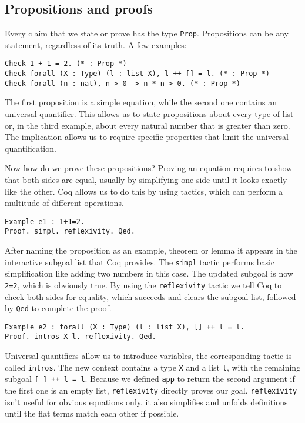\documentclass{scrreprt}
\newcommand{\todo}[1]{\marginpar{\textbf{TODO:} #1}}
\begin{document}
\subsection{Propositions and proofs}
Every claim that we state or prove has the type \texttt{Prop}. Propositions can be any statement, regardless of its truth. A few examples:
\begin{verbatim}
Check 1 + 1 = 2. (* : Prop *)
Check forall (X : Type) (l : list X), l ++ [] = l. (* : Prop *)
Check forall (n : nat), n > 0 -> n * n > 0. (* : Prop *)
\end{verbatim}
The first proposition is a simple equation, while the second one contains an universal quantifier. This allows us to state propositions about every type of list or, in the third example, about every natural number that is greater than zero. The implication allows us to require specific properties that limit the universal quantification.
\par
Now how do we prove these propositions? Proving an equation requires to show that both sides are equal, usually by simplifying one side until it looks exactly like the other. Coq allows us to do this by using tactics, which can perform a multitude of different operations.
\begin{verbatim}
Example e1 : 1+1=2.
Proof. simpl. reflexivity. Qed. 
\end{verbatim} 
\todo{Highlighting für Proof und Qed}
After naming the proposition as an example, theorem or lemma it appears in the interactive subgoal list that Coq provides. The \texttt{simpl} tactic performs basic simplification like adding two numbers in this case. The updated subgoal is now \texttt{2=2}, which is obviously true. By using the \texttt{reflexivity} tactic we tell Coq to check both sides for equality, which succeeds and clears the subgoal list, followed by \texttt{Qed} to complete the proof.
\begin{verbatim}
Example e2 : forall (X : Type) (l : list X), [] ++ l = l.
Proof. intros X l. reflexivity. Qed.
\end{verbatim}
Universal quantifiers allow us to introduce variables, the corresponding tactic is called \texttt{intros}. The new context contains a type \texttt{X} and a list \texttt{l}, with the remaining subgoal \texttt{[ ] ++ l = l}. Because we defined \texttt{app} to return the second argument if the first one is an empty list, \texttt{reflexivity} directly proves our goal. \texttt{reflexivity} isn't useful for obvious equations only, it also simplifies and unfolds definitions until the flat terms match each other if possible.
\end{document}
